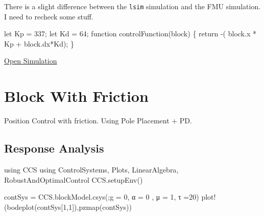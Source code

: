 \documentclass[
  8pt,
  a4paper,
]{book}
\newenvironment{Shaded}{\begin{snugshade}}{\end{snugshade}}
\newcommand{\BuiltInTok}[1]{\textcolor[rgb]{0.00,0.23,0.31}{#1}}
\newcommand{\FloatTok}[1]{\textcolor[rgb]{0.68,0.00,0.00}{#1}}
\newcommand{\FunctionTok}[1]{\textcolor[rgb]{0.28,0.35,0.67}{#1}}
\newcommand{\ImportTok}[1]{\textcolor[rgb]{0.00,0.46,0.62}{#1}}
\newcommand{\NormalTok}[1]{\textcolor[rgb]{0.00,0.23,0.31}{#1}}
\newcommand{\OperatorTok}[1]{\textcolor[rgb]{0.37,0.37,0.37}{#1}}
\begin{document}
There is a slight difference between the \texttt{lsim} simulation and
the FMU simulation. I need to recheck some stuff.

\begin{Shaded}
\begin{Highlighting}[]
\NormalTok{let Kp = 337;}
\NormalTok{let Kd = 64;}
\NormalTok{function controlFunction(block)}
\NormalTok{\{}
\NormalTok{  return {-}( block.x * Kp + block.dx*Kd);}
\NormalTok{\}}
\end{Highlighting}
\end{Shaded}

\href{https://pages.icpmol.es/ControlChallenges/index.html?target=TutorialBlockWithFriction&code=bGV0IEtwID0gMzM3OwpsZXQgS2QgPSA2NDsKZnVuY3Rpb24gY29udHJvbEZ1bmN0aW9uKGJsb2NrKQp7CiAgcmV0dXJuIC0oIGJsb2NrLnggKiBLcCArIGJsb2NrLmR4KktkKTsKfQ==}{Open
Simulation}

\chapter{Block With Friction}\label{block-with-friction-1}

Position Control with friction. Using Pole Placement + PD.

\hfill\break

\section{Response Analysis}\label{response-analysis}

\begin{Shaded}
\begin{Highlighting}[]
\ImportTok{using} \BuiltInTok{CCS}
\ImportTok{using} \BuiltInTok{ControlSystems}\NormalTok{, }\BuiltInTok{Plots}\NormalTok{, }\BuiltInTok{LinearAlgebra}\NormalTok{, }\BuiltInTok{RobustAndOptimalControl}
\NormalTok{CCS.}\FunctionTok{setupEnv}\NormalTok{()}

\NormalTok{contSys }\OperatorTok{=}\NormalTok{ CCS.blockModel.}\FunctionTok{csys}\NormalTok{(;g }\OperatorTok{=} \FloatTok{0}\NormalTok{, α }\OperatorTok{=} \FloatTok{0}\NormalTok{ , μ }\OperatorTok{=} \FloatTok{1}\NormalTok{, τ }\OperatorTok{=}\FloatTok{20}\NormalTok{)}
\FunctionTok{plot!}\NormalTok{(}\FunctionTok{bodeplot}\NormalTok{(contSys[}\FloatTok{1}\NormalTok{,}\FloatTok{1}\NormalTok{]),}\FunctionTok{pzmap}\NormalTok{(contSys))}
\end{Highlighting}
\end{Shaded}
\end{document}
